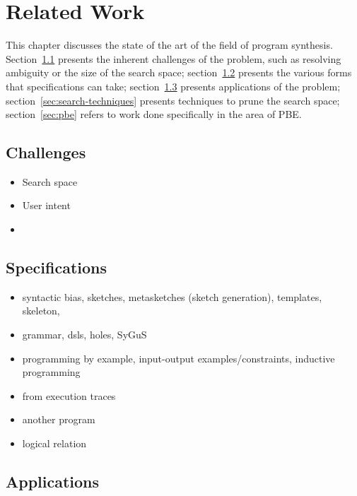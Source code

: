 \chapter{Related Work}
\label{chapter:relatedWork}


This chapter discusses the state of the art of the field of program synthesis.
Section~\ref{sec:challenges} presents the inherent challenges of the problem,
such as resolving ambiguity or the size of the search space;
section~\ref{sec:specifications} presents the various forms
that specifications can take;
section~\ref{sec:applications} presents applications of the problem;
section~\ref{sec:search-techniques} presents techniques to prune the search
space;
section~\ref{sec:pbe} refers to work done specifically in the area of \ac{PBE}.

\section{Challenges}
\label{sec:challenges}

\begin{itemize}
\item Search space
\item User intent
  \item 
\end{itemize}

\section{Specifications}
\label{sec:specifications}

\begin{itemize}
\item syntactic bias, sketches, metasketches (sketch generation), templates, skeleton,
\item   grammar, dsls, holes, SyGuS
\item programming by example, input-output examples/constraints, inductive programming
\item from execution traces
\item another program
\item logical relation
\end{itemize}

\section{Applications}
\label{sec:applications}

